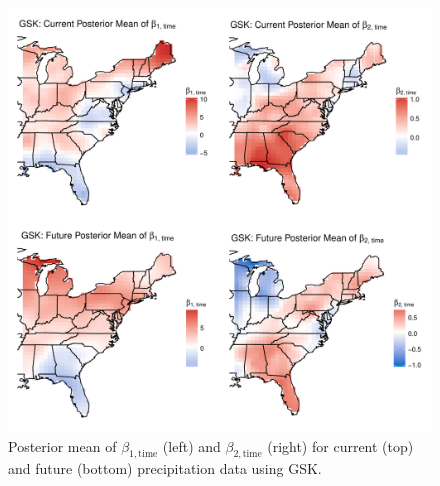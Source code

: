 \documentclass[11pt]{article}
\begin{document}
\begin{figure}[htbp]  %
  \centering
  \includegraphics[width=\linewidth]{plots/precip-gsk-post-betatime.pdf}
  \caption{Posterior mean of $\beta_{1, \text{time}}$ (left) and $\beta_{2, \text{time}}$ (right) for current (top) and future (bottom) precipitation data using GSK.}
  \label{ebfig:fire-gskpostbeta1}
\end{figure}
\end{document}
